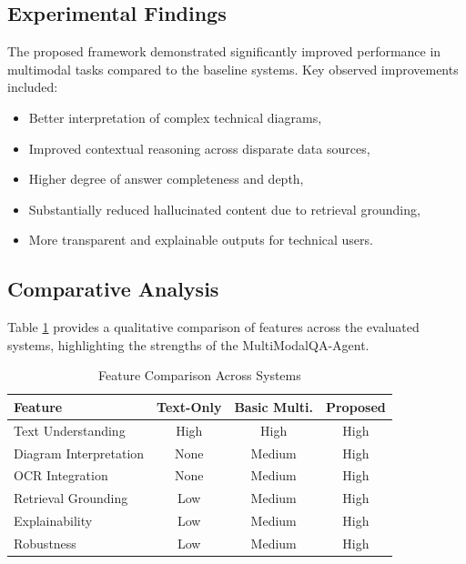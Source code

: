 \documentclass[conference]{IEEEtran}
\begin{document}
\subsection{Experimental Findings}
The proposed framework demonstrated significantly improved performance in multimodal tasks compared to the baseline systems. Key observed improvements included:
\begin{itemize}
    \item Better interpretation of complex technical diagrams,
    \item Improved contextual reasoning across disparate data sources,
    \item Higher degree of answer completeness and depth,
    \item Substantially reduced hallucinated content due to retrieval grounding,
    \item More transparent and explainable outputs for technical users.
\end{itemize}

\subsection{Comparative Analysis}
Table \ref{tab:feature_comp} provides a qualitative comparison of features across the evaluated systems, highlighting the strengths of the MultiModalQA-Agent.

\begin{table}[htbp]
\centering
\caption{Feature Comparison Across Systems}
\label{tab:feature_comp}
\begin{tabular}{|l|c|c|c|}
\hline
\textbf{Feature} & \textbf{Text-Only} & \textbf{Basic Multi.} & \textbf{Proposed} \\ \hline
Text Understanding & High & High & High \\ \hline
Diagram Interpretation & None & Medium & High \\ \hline
OCR Integration & None & Medium & High \\ \hline
Retrieval Grounding & Low & Medium & High \\ \hline
Explainability & Low & Medium & High \\ \hline
Robustness & Low & Medium & High \\ \hline
\end{tabular}
\end{table}
\end{document}
